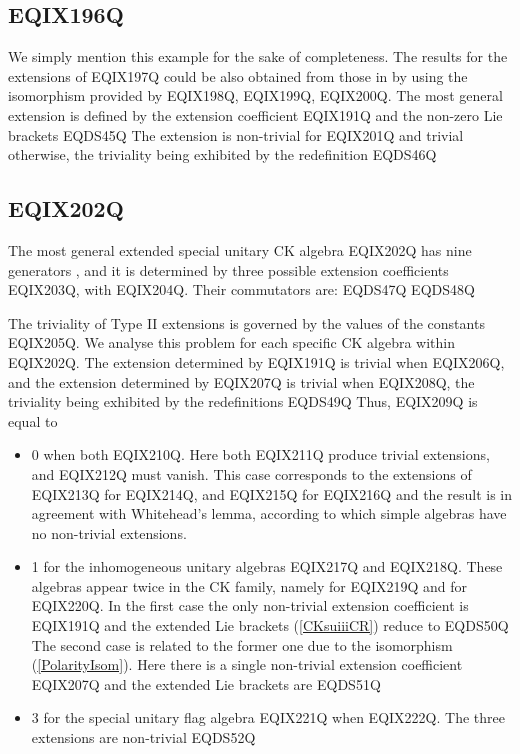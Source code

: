 \subsection{EQIX196Q }

We simply mention this example for the sake of completeness. The
results for the extensions of EQIX197Q could be also obtained
from those in
\cite{Azc.Her.Bue.San:96}
by using the isomorphism  provided by
EQIX198Q,
EQIX199Q,
EQIX200Q.
The most general extension is defined
by the extension coefficient EQIX191Q
and the non-zero Lie brackets
EQDS45Q
The extension is non-trivial for EQIX201Q and trivial otherwise, the
triviality being exhibited by the redefinition
EQDS46Q

\subsection{EQIX202Q }

The most general extended  special unitary CK algebra
EQIX202Q  has nine generators
, and it is determined by three possible extension
coefficients EQIX203Q, with
EQIX204Q.  Their  commutators are:
EQDS47Q
EQDS48Q

The triviality of Type II extensions is governed by the values of the
constants EQIX205Q. We analyse this problem for each specific CK
algebra within EQIX202Q. The extension
determined by EQIX191Q is trivial when EQIX206Q, and the
extension determined by EQIX207Q is trivial when EQIX208Q, the
triviality being exhibited by the redefinitions
EQDS49Q
Thus, EQIX209Q  is equal to

\begin{itemize}
\item
0 when both EQIX210Q. Here both
EQIX211Q produce trivial extensions, and EQIX212Q
must vanish. This case corresponds to the extensions of EQIX213Q for
EQIX214Q,  and  EQIX215Q for
EQIX216Q and the result is in agreement
with Whitehead's lemma, according to which simple algebras have no
non-trivial extensions.

\item
1 for the inhomogeneous unitary algebras EQIX217Q and
EQIX218Q. These algebras appear twice in the CK family, namely
for EQIX219Q and for EQIX220Q. In the
first case the only non-trivial extension coefficient is
EQIX191Q and the extended Lie brackets (\ref{CKsuiiiCR}) reduce to
EQDS50Q
The second case  is related to the former one due to the isomorphism
(\ref{PolarityIsom}). Here there is a single non-trivial extension
coefficient EQIX207Q and the extended Lie brackets are
EQDS51Q

\item
3 for the special unitary flag algebra EQIX221Q
when EQIX222Q. The three extensions are  non-trivial
EQDS52Q
\end{itemize}

